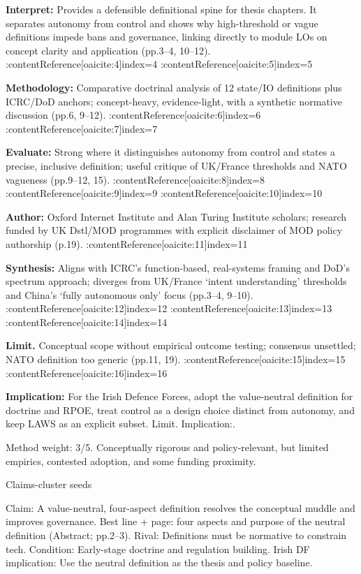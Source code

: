 \textbf{Interpret:} Provides a defensible definitional spine for thesis chapters. It separates autonomy from control and shows why high-threshold or vague definitions impede bans and governance, linking directly to module LOs on concept clarity and application (pp.3–4, 10–12). :contentReference[oaicite:4]{index=4} :contentReference[oaicite:5]{index=5}

\textbf{Methodology:} Comparative doctrinal analysis of 12 state/IO definitions plus ICRC/DoD anchors; concept-heavy, evidence-light, with a synthetic normative discussion (pp.6, 9–12). :contentReference[oaicite:6]{index=6} :contentReference[oaicite:7]{index=7}

\textbf{Evaluate:} Strong where it distinguishes autonomy from control and states a precise, inclusive definition; useful critique of UK/France thresholds and NATO vagueness (pp.9–12, 15). :contentReference[oaicite:8]{index=8} :contentReference[oaicite:9]{index=9} :contentReference[oaicite:10]{index=10}

\textbf{Author:} Oxford Internet Institute and Alan Turing Institute scholars; research funded by UK Dstl/MOD programmes with explicit disclaimer of MOD policy authorship (p.19). :contentReference[oaicite:11]{index=11}

\textbf{Synthesis:} Aligns with ICRC’s function-based, real-systems framing and DoD’s spectrum approach; diverges from UK/France ‘intent understanding’ thresholds and China’s ‘fully autonomous only’ focus (pp.3–4, 9–10). :contentReference[oaicite:12]{index=12} :contentReference[oaicite:13]{index=13} :contentReference[oaicite:14]{index=14}

\textbf{Limit.} Conceptual scope without empirical outcome testing; consensus unsettled; NATO definition too generic (pp.11, 19). :contentReference[oaicite:15]{index=15} :contentReference[oaicite:16]{index=16}

\textbf{Implication:} For the Irish Defence Forces, adopt the value-neutral definition for doctrine and RPOE, treat control as a design choice distinct from autonomy, and keep LAWS as an explicit subset. Limit. Implication:.

Method weight: 3/5. Conceptually rigorous and policy-relevant, but limited empirics, contested adoption, and some funding proximity.

Claims-cluster seeds

Claim: A value-neutral, four-aspect definition resolves the conceptual muddle and improves governance.
Best line + page: four aspects and purpose of the neutral definition (Abstract; pp.2–3).
Rival: Definitions must be normative to constrain tech.
Condition: Early-stage doctrine and regulation building.
Irish DF implication: Use the neutral definition as the thesis and policy baseline.


